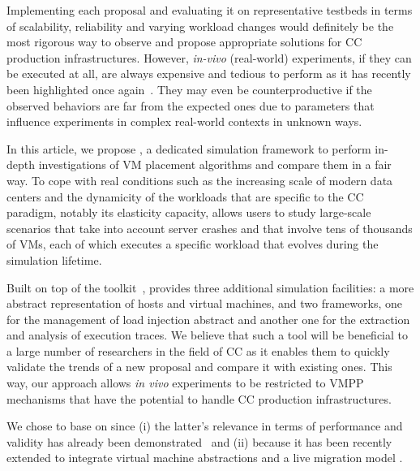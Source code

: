 Implementing each proposal and evaluating it on representative
testbeds in terms of scalability, reliability and varying workload
changes would definitely be the most rigorous way to observe and
propose appropriate solutions for CC production infrastructures.
However, \textit{in-vivo} (\ie real-world) experiments, if they can be
executed at all, are always expensive and tedious to perform as it has
recently been highlighted once again~\cite{barker:pitfalls}. They may
even be counterproductive if the observed behaviors are far from the
expected ones due to parameters that influence experiments in complex
real-world contexts in unknown ways. 

In this article, we propose \vmps, a dedicated simulation framework to
perform in-depth investigations of VM placement algorithms and compare
them in a fair way. To cope with real conditions such as the
increasing scale of modern data centers and the dynamicity of the
workloads that are specific to the CC paradigm, notably its elasticity
capacity, \vmps allows users to study large-scale scenarios that take
into account server crashes and that involve tens of thousands of VMs,
each of which executes
 a specific workload that evolves during the
simulation lifetime.

Built on top of the \sg toolkit~\cite{casanova:hal-01017319}, \vmps
provides three additional simulation facilities: a more abstract
representation of hosts and virtual machines, and two frameworks, one
for the management of load injection abstract and another one for the
extraction and analysis of execution traces. We believe that such a
tool will be beneficial to a large number of researchers in the field
of CC as it enables them to quickly validate
the trends of a new proposal and compare it with existing
ones. This way, our approach allows \textit{in vivo} experiments to be
restricted to VMPP mechanisms that have the potential to handle CC
production infrastructures.

%
We chose to base \vmps on \sg since (i) the latter's relevance in
terms of performance and validity has already been
demonstrated~\cite{simgridpub} and (ii) because it has been recently
extended to integrate virtual machine abstractions and a live
migration model \cite{Hirofuchi:2013:ALM:2568486.2568524}.

